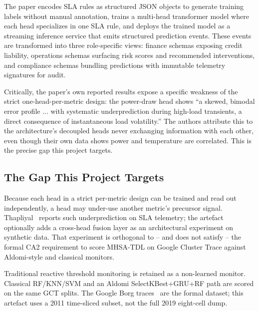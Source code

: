 The paper encodes SLA rules as structured JSON objects to generate training labels without manual annotation, trains a multi-head transformer model where each head specializes in one SLA rule, and deploys the trained model as a streaming inference service that emits structured prediction events. These events are transformed into three role-specific views: finance schemas exposing credit liability, operations schemas surfacing risk scores and recommended interventions, and compliance schemas bundling predictions with immutable telemetry signatures for audit.

Critically, the paper's own reported results expose a specific weakness of the strict one-head-per-metric design: the power-draw head shows ``a skewed, bimodal error profile ... with systematic underprediction during high-load transients, a direct consequence of instantaneous load volatility.'' The authors attribute this to the architecture's decoupled heads never exchanging information with each other, even though their own data shows power and temperature are correlated. This is the precise gap this project targets.

\subsection{The Gap This Project Targets}
\label{subsec:gap}

Because each head in a strict per-metric design can be trained and read out independently, a head may under-use another metric's precursor signal. Thapliyal~\cite{Thapliyal26} reports such underprediction on SLA telemetry; the artefact optionally adds a cross-head fusion layer as an architectural experiment on synthetic data. That experiment is orthogonal to -- and does not satisfy -- the formal CA2 requirement to score MHSA-TDL on Google Cluster Trace against Aldomi-style and classical monitors.

Traditional reactive threshold monitoring is retained as a non-learned monitor. Classical RF/KNN/SVM and an Aldomi SelectKBest+GRU+RF path are scored on the same GCT splits. The Google Borg traces~\cite{Tirmazi20,Liu12} are the formal dataset; this artefact uses a 2011 time-sliced subset, not the full 2019 eight-cell dump.
